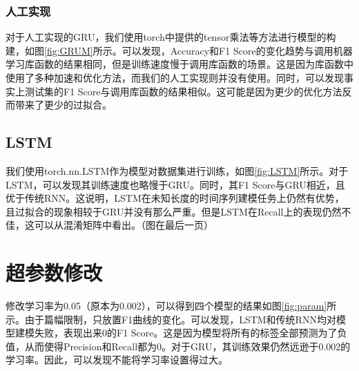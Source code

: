 \documentclass[UTF8]{article}
\begin{document}
\subsubsection{人工实现}
对于人工实现的GRU，我们使用torch中提供的tensor乘法等方法进行模型的构建，如图\ref{fig:GRUM}所示。可以发现，Accuracy和F1 Score的变化趋势与调用机器学习库函数的结果相同，但是训练速度慢于调用库函数的场景。这是因为库函数中使用了多种加速和优化方法，而我们的人工实现则并没有使用。同时，可以发现事实上测试集的F1 Score与调用库函数的结果相似。这可能是因为更少的优化方法反而带来了更少的过拟合。

\subsection{LSTM}
我们使用torch.nn.LSTM作为模型对数据集进行训练，如图\ref{fig:LSTM}所示。对于LSTM，可以发现其训练速度也略慢于GRU。同时，其F1 Score与GRU相近，且优于传统RNN。这说明，LSTM在未知长度的时间序列建模任务上仍然有优势，且过拟合的现象相较于GRU并没有那么严重。但是LSTM在Recall上的表现仍然不佳，这可以从混淆矩阵中看出。（图在最后一页）

\section{超参数修改}
修改学习率为0.05（原本为0.002），可以得到四个模型的结果如图\ref{fig:param}所示。由于篇幅限制，只放置F1曲线的变化。可以发现，LSTM和传统RNN均对模型建模失败，表现出来0的F1 Score。这是因为模型将所有的标签全部预测为了负值，从而使得Precision和Recall都为0。对于GRU，其训练效果仍然远逊于0.002的学习率。因此，可以发现不能将学习率设置得过大。
\end{document}
